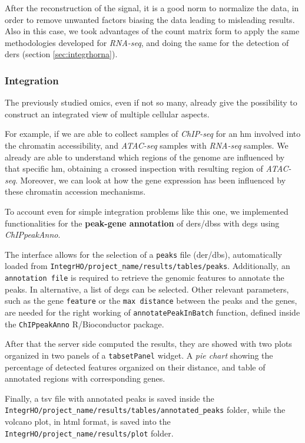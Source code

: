 After the reconstruction of the signal, it is a good norm to normalize the data, in order to remove unwanted factors biasing the data leading to misleading results.
Also in this case, we took advantages of the count matrix form to apply the same methodologies developed for \textit{RNA-seq}, and doing the same for the detection of \glspl{der} (section \ref{sec:integrhorna}).

\subsubsection{Integration} \label{sec:integrhointegration}
The previously studied omics, even if not so many, already give the possibility to construct an integrated view of multiple cellular aspects.

For example, if we are able to collect samples of \textit{ChIP-seq} for an \gls{hm} involved into the chromatin accessibility, and \textit{ATAC-seq} samples with \textit{RNA-seq} samples.
We already are able to understand which regions of the genome are influenced by that  specific \gls{hm}, obtaining a crossed inspection with resulting region of \textit{ATAC-seq}.
Moreover, we can look at how the gene expression has been influenced by these chromatin accession mechanisms.

To account even for simple integration problems like this one, we implemented functionalities for the \textbf{peak-gene annotation} of \glspl{der}/\glspl{dbs} with \glspl{deg} using \textit{ChIPpeakAnno}.

The interface allows for the selection of a \lstinline!peaks! file (\gls{der}/\gls{dbs}), automatically loaded from  \lstinline!IntegrHO/project_name/results/tables/peaks!.
Additionally, an \lstinline!annotation file! is required to retrieve the genomic features to annotate the peaks.
In alternative, a list of \glspl{deg} can be selected.
Other relevant parameters, such as the gene \lstinline!feature!  or the \lstinline!max distance! between the peaks and the genes, are needed for the right working of \lstinline!annotatePeakInBatch! function, defined inside the \lstinline!ChIPpeakAnno! R/Bioconductor package.

After that the server side computed the results, they are showed with two plots organized in two panels of a \lstinline!tabsetPanel! widget. 
A \textit{pie chart} showing the percentage of detected features organized on their distance, and table of annotated regions with corresponding genes.

Finally, a \gls{tsv} file with annotated peaks is saved inside the  \lstinline!IntegrHO/project_name/results/tables/annotated_peaks! folder, while the volcano plot, in \gls{html} format, is saved into the \lstinline!IntegrHO/project_name/results/plot! folder.

